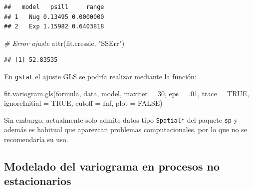 \documentclass[
  spanish,
]{book}
\newenvironment{Shaded}{\begin{snugshade}}{\end{snugshade}}
\newcommand{\AttributeTok}[1]{\textcolor[rgb]{0.77,0.63,0.00}{#1}}
\newcommand{\CommentTok}[1]{\textcolor[rgb]{0.56,0.35,0.01}{\textit{#1}}}
\newcommand{\ConstantTok}[1]{\textcolor[rgb]{0.00,0.00,0.00}{#1}}
\newcommand{\DecValTok}[1]{\textcolor[rgb]{0.00,0.00,0.81}{#1}}
\newcommand{\FloatTok}[1]{\textcolor[rgb]{0.00,0.00,0.81}{#1}}
\newcommand{\FunctionTok}[1]{\textcolor[rgb]{0.00,0.00,0.00}{#1}}
\newcommand{\NormalTok}[1]{#1}
\newcommand{\SpecialCharTok}[1]{\textcolor[rgb]{0.00,0.00,0.00}{#1}}
\newcommand{\StringTok}[1]{\textcolor[rgb]{0.31,0.60,0.02}{#1}}
\theoremstyle{break}
\theoremstyle{definition}
\theoremstyle{definition}
\theoremstyle{definition}
\theoremstyle{definition}
\theoremstyle{remark}
\begin{document}
\begin{verbatim}
##   model   psill     range
## 1   Nug 0.13495 0.0000000
## 2   Exp 1.15982 0.6403818
\end{verbatim}

\begin{Shaded}
\begin{Highlighting}[]
\CommentTok{\# Error ajuste}
\FunctionTok{attr}\NormalTok{(fit.cressie, }\StringTok{"SSErr"}\NormalTok{)}
\end{Highlighting}
\end{Shaded}

\begin{verbatim}
## [1] 52.83535
\end{verbatim}

En \texttt{gstat} el ajuste GLS se podría realizar mediante la función:

\begin{Shaded}
\begin{Highlighting}[]
\FunctionTok{fit.variogram.gls}\NormalTok{(formula, data, model, }\AttributeTok{maxiter =} \DecValTok{30}\NormalTok{, }\AttributeTok{eps =}\NormalTok{ .}\DecValTok{01}\NormalTok{, }
      \AttributeTok{trace =} \ConstantTok{TRUE}\NormalTok{, }\AttributeTok{ignoreInitial =} \ConstantTok{TRUE}\NormalTok{, }\AttributeTok{cutoff =} \ConstantTok{Inf}\NormalTok{, }\AttributeTok{plot =} \ConstantTok{FALSE}\NormalTok{)}
\end{Highlighting}
\end{Shaded}

Sin embargo, actualmente solo admite datos tipo \texttt{Spatial*} del paquete \texttt{sp} y además es habitual que aparezcan problemas computacionales, por lo que no se recomendaría su uso.

\begin{Shaded}
\end{Shaded}

\hypertarget{trend-fit}{%
\subsection{Modelado del variograma en procesos no estacionarios}\label{trend-fit}}
\end{document}
